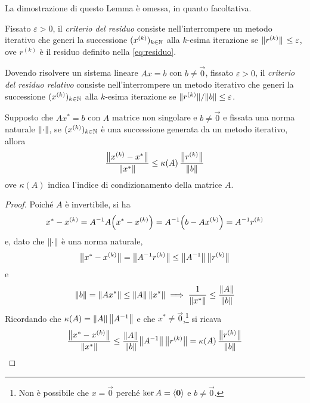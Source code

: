 	La dimostrazione di questo Lemma è omessa, in quanto facoltativa.
	
	\begin{definizione}
		Fissato \(\varepsilon > 0\), il \emph{criterio del residuo} consiste nell'interrompere un metodo iterativo che generi la successione \((x^{(k)})_{k \in \N}\) alla \(k\)-esima iterazione se \(\norm*{r^{(k)}} \le \varepsilon\), ove \(r^{(k)}\) è il residuo definito nella \eqref{eq:residuo}.
	\end{definizione}

	\begin{definizione}
		Dovendo risolvere un sistema lineare \(A x = b\) con \(b \ne \vec{0}\), fissato \(\varepsilon > 0\), il \emph{criterio del residuo relativo} consiste nell'interrompere un metodo iterativo che generi la successione \((x^{(k)})_{k \in \N}\) alla \(k\)-esima iterazione se \(\norm*{r^{(k)}} \! / \norm{b} \le \varepsilon\).
	\end{definizione}
	
	\begin{teorema}\label{th:stima-criterio-residuo-relativo}
		Supposto che \(A x^* = b\) con \(A\) matrice non singolare e \(b \ne \vec{0}\) e fissata una norma naturale \(\norm{\cdot}\), se \((x^{(k)})_{k \in \N}\) è una successione generata da un metodo iterativo, allora
		\begin{equation}\label{eq:stima-criterio-residuo-relativo}
			\frac{\bigl\| x^{(k)} - x^* \bigr\|}{\norm{x^*}} \le \kappa (A) \, \frac{\bigl\| r^{(k)} \bigr\|}{\norm{b}}
		\end{equation}
		ove \(\kappa (A)\) indica l'indice di condizionamento della matrice \(A\).
	\end{teorema}

	\begin{proof}
		Poiché \(A\) è invertibile, si ha
		\begin{equation*}
			x^* - x^{(k)} = A^{-1} A \qty(x^* - x^{(k)}) = A^{-1} \qty(b - A x^{(k)}) = A^{-1} r^{(k)}
		\end{equation*}
		e, dato che \(\norm{\cdot}\) è una norma naturale,
		\begin{equation*}
			\bigl\| x^* - x^{(k)} \bigr\| = \bigl\| A^{-1} r^{(k)} \bigr\| \le \norm{A^{-1}} \, \bigl\| r^{(k)} \bigr\|
		\end{equation*}
		e
		\begin{equation*}
			\norm{b} = \norm{A x^*} \le \norm{A} \, \norm{x^*} \implies \frac{1}{\norm{x^*}} \le \frac{\norm{A}}{\norm{b}}
		\end{equation*}
		Ricordando che \(\kappa (A) = \norm{A} \, \norm{A^{-1}}\) e che \(x^* \ne \vec{0}\),\footnote{Non è possibile che \(x = \vec{0}\) perché \(\ker A = \Braket{\vec{0}}\) e \(b \ne \vec{0}\).} si ricava
		\begin{equation*}
			\frac{\bigl\| x^* - x^{(k)} \bigr\|}{\norm{x^*}} \le \frac{\norm{A}}{\norm{b}} \norm{A^{-1}} \, \bigl\| r^{(k)} \bigr\| = \kappa (A) \, \frac{\bigl\| r^{(k)} \bigr\|}{\norm{b}} \qedhere
		\end{equation*}
	\end{proof}

